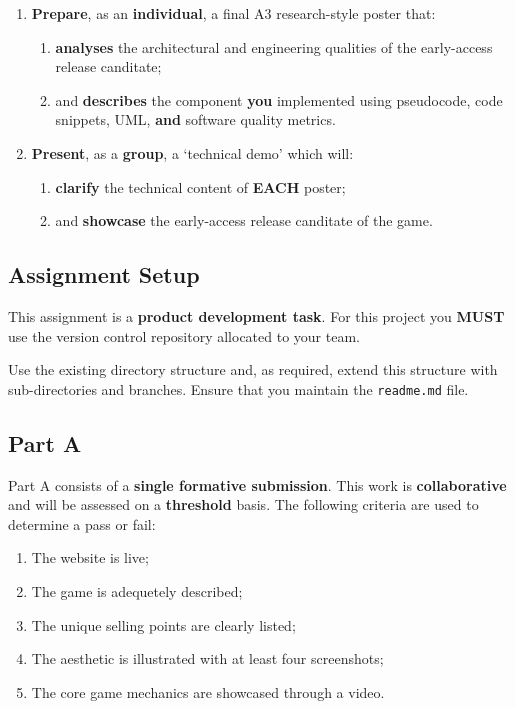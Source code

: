 \documentclass{../../fal_assignment}
\begin{document}
\begin{enumerate}[label=(\Alph*)]
    \item \textbf{Prepare}, as an \textbf{individual}, a final A3 research-style poster that:
    	\begin{enumerate}[label=\roman*.]
    		\item \textbf{analyses} the architectural and engineering qualities of the early-access release canditate;
    		\item and \textbf{describes} the component \textbf{you} implemented using pseudocode, code snippets, UML, \textbf{and} software quality metrics. 
	\end{enumerate}
    \item \textbf{Present}, as a \textbf{group}, a `technical demo' which will:
    	\begin{enumerate}[label=\roman*.]
    		\item \textbf{clarify} the technical content of \textbf{EACH} poster;
    		\item and \textbf{showcase} the early-access release canditate of the game.
	\end{enumerate}
\end{enumerate}
  
\subsection*{Assignment Setup}

This assignment is a \textbf{product development task}. For this project you \textbf{MUST} use the version control repository allocated to your team.

Use the existing directory structure and, as required, extend this structure with sub-directories and branches. Ensure that you maintain the \texttt{readme.md} file. 

\subsection*{Part A}

Part A consists of a \textbf{single formative submission}. This work is \textbf{collaborative} and will be assessed on a \textbf{threshold} basis. The following criteria are used to determine a pass or fail:

\begin{enumerate}[label=(\alph*)]
	\item The website is live;
	\item The game is adequetely described;
	\item The unique selling points are clearly listed;
	\item The aesthetic is illustrated with at least four screenshots;
	\item The core game mechanics are showcased through a video.
\end{enumerate}
\end{document}
